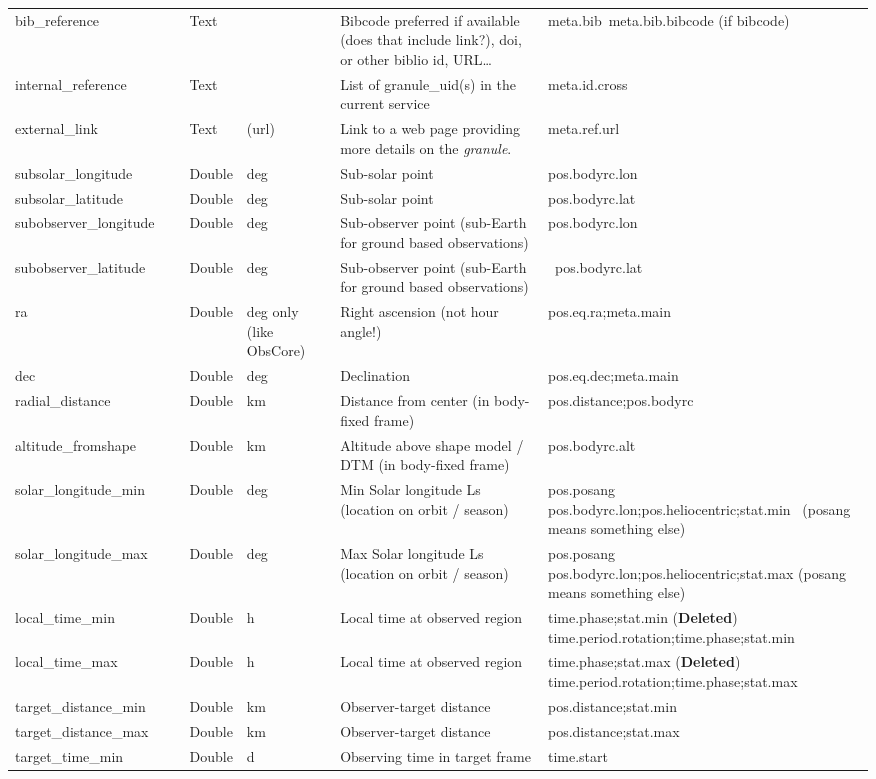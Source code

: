 \documentclass[11pt,a4paper]{ivoa}
\begin{document}
\begin{longtable}{p{3.5cm}p{0.5cm}p{1cm}p{1cm}p{7cm}p{3cm}}
bib\_reference& &Text& &Bibcode preferred if available (does that include link?), doi, or other biblio id, URL…&meta.bib meta.bib.bibcode (if bibcode) \\
internal\_reference& &Text& &List of granule\_uid(s) in the current service&meta.id.cross\\
external\_link& &Text&(url)&Link to a web page providing more details on the \emph{granule}.&meta.ref.url\\
subsolar\_longitude& &Double&deg&Sub-solar point&pos.bodyrc.lon\\
subsolar\_latitude& &Double&deg&Sub-solar point&pos.bodyrc.lat\\
subobserver\_longitude& &Double&deg&Sub-observer point (sub-Earth for ground based observations)&pos.bodyrc.lon\\
subobserver\_latitude& &Double&deg&Sub-observer point (sub-Earth for ground based observations)& pos.bodyrc.lat\\
ra& &Double&deg only (like ObsCore)&Right ascension (not hour angle!)&pos.eq.ra;meta.main\\
dec& &Double&deg&Declination&pos.eq.dec;meta.main\\
radial\_distance& &Double&km&Distance from center (in body-fixed frame)&pos.distance;pos.bodyrc \\
altitude\_fromshape& &Double&km&Altitude above shape model / DTM (in body-fixed frame)&pos.bodyrc.alt \\
solar\_longitude\_min& &Double&deg&Min Solar longitude Ls (location on orbit / season)&pos.posang pos.bodyrc.lon;pos.heliocentric;stat.min  (posang means something else)\\
solar\_longitude\_max& &Double&deg&Max Solar longitude Ls (location on orbit / season)&pos.posang pos.bodyrc.lon;pos.heliocentric;stat.max (posang means something else)\\
local\_time\_min& &Double&h&Local time at observed region&time.phase;stat.min (\textbf{Deleted}) time.period.rotation;time.phase;stat.min\\
local\_time\_max& &Double&h&Local time at observed region&time.phase;stat.max (\textbf{Deleted}) time.period.rotation;time.phase;stat.max \\
target\_distance\_min& &Double&km&Observer-target distance&pos.distance;stat.min\\
target\_distance\_max& &Double&km&Observer-target distance&pos.distance;stat.max\\
target\_time\_min& &Double&d&Observing time in target frame &time.start\\

\end{longtable}
\end{document}
